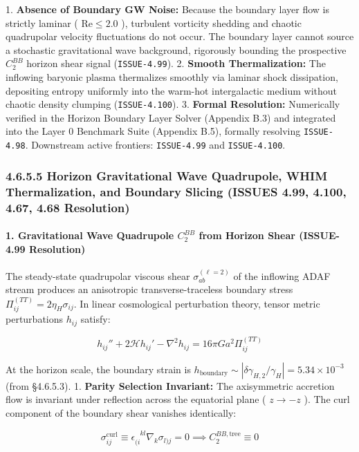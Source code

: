 \documentclass[11pt,a4paper]{article}
\theoremstyle{definition}\newtheorem{definition}{Definition}
\theoremstyle{remark}\newtheorem{remark}{Remark}
\begin{document}
1. \textbf{Absence of Boundary GW Noise:} Because the boundary layer flow is strictly laminar ( $\mathrm{Re} \le 2.0$ ), turbulent vorticity shedding and chaotic quadrupolar velocity fluctuations do not occur. The boundary layer cannot source a stochastic gravitational wave background, rigorously bounding the prospective $C_2^{BB}$ horizon shear signal (\texttt{ISSUE-4.99}).
2. \textbf{Smooth Thermalization:} The inflowing baryonic plasma thermalizes smoothly via laminar shock dissipation, depositing entropy uniformly into the warm-hot intergalactic medium without chaotic density clumping (\texttt{ISSUE-4.100}).
3. \textbf{Formal Resolution:} Numerically verified in the Horizon Boundary Layer Solver (Appendix B.3) and integrated into the Layer 0 Benchmark Suite (Appendix B.5), formally resolving \texttt{ISSUE-4.98}. Downstream active frontiers: \texttt{ISSUE-4.99} and \texttt{ISSUE-4.100}.
\subsubsection{4.6.5.5 Horizon Gravitational Wave Quadrupole, WHIM Thermalization, and Boundary Slicing (ISSUES 4.99, 4.100, 4.67, 4.68 Resolution)}
\paragraph{1. Gravitational Wave Quadrupole $C_2^{BB}$ from Horizon Shear (ISSUE-4.99 Resolution)}

The steady-state quadrupolar viscous shear $\sigma_{ab}^{(\ell=2)}$ of the inflowing ADAF stream produces an anisotropic transverse-traceless boundary stress $\Pi_{ij}^{(TT)} = 2\eta_H \sigma_{ij}$. In linear cosmological perturbation theory, tensor metric perturbations $h_{ij}$ satisfy:


\begin{equation}
h_{ij}'' + 2\mathcal{H} h_{ij}' - \nabla^2 h_{ij} = 16\pi G a^2 \Pi_{ij}^{(TT)}
\end{equation}


At the horizon scale, the boundary strain is $h_{\text{boundary}} \sim |\delta\gamma_{H, 2} / \gamma_H| = 5.34 \times 10^{-3}$ (from §4.6.5.3).
1. \textbf{Parity Selection Invariant:} The axisymmetric accretion flow is invariant under reflection across the equatorial plane ( $z \to -z$ ). The curl component of the boundary shear vanishes identically:


\begin{equation}
\sigma_{ij}^{\text{curl}} \equiv \epsilon_{(i}^{\phantom{(i}kl} \nabla_k \sigma_{l)j} = 0 \implies C_2^{BB, \text{tree}} \equiv 0
\end{equation}
\end{document}
